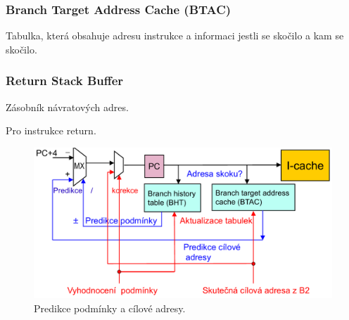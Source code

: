 \subsubsection{Branch Target Address Cache (BTAC)}

\begin{compactitem}
    \item Tabulka, která obsahuje adresu instrukce a informaci jestli se skočilo a kam se skočilo.
\end{compactitem}

\subsubsection{Return Stack Buffer}

\begin{compactitem}
    \item Zásobník návratových adres.
    \item Pro instrukce return.
\end{compactitem}

\begin{figure}[H]
    \centering
    \includegraphics[width=0.8\linewidth]{predikce_podminky_a_cilove_adresy.pdf}
    \caption{Predikce podmínky a cílové adresy.}
\end{figure}
